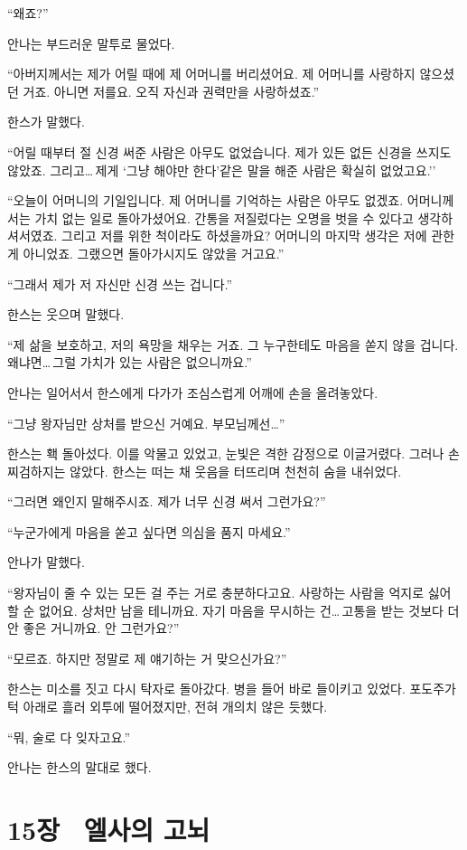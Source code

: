 ``왜죠?''

안나는 부드러운 말투로 물었다.

``아버지께서는 제가 어릴 때에 제 어머니를 버리셨어요. 제 어머니를 사랑하지 않으셨던 거죠. 아니면 저를요. 오직 자신과 권력만을 사랑하셨죠.''

한스가 말했다.

``어릴 때부터 절 신경 써준 사람은 아무도 없었습니다. 제가 있든 없든 신경을 쓰지도 않았죠. 그리고\ldots\,제게 `그냥 해야만 한다'같은 말을 해준 사람은 확실히 없었고요.''

``오늘이 어머니의 기일입니다. 제 어머니를 기억하는 사람은 아무도 없겠죠. 어머니께서는 가치 없는 일로 돌아가셨어요. 간통을 저질렀다는 오명을 벗을 수 있다고 생각하셔서였죠. 그리고 저를 위한 척이라도 하셨을까요? 어머니의 마지막 생각은 저에 관한 게 아니었죠. 그랬으면 돌아가시지도 않았을 거고요.''

``그래서 제가 저 자신만 신경 쓰는 겁니다.''

한스는 웃으며 말했다.

``제 삶을 보호하고, 저의 욕망을 채우는 거죠. 그 누구한테도 마음을 쏟지 않을 겁니다. 왜냐면\ldots\,그럴 가치가 있는 사람은 없으니까요.''

안나는 일어서서 한스에게 다가가 조심스럽게 어깨에 손을 올려놓았다.

``그냥 왕자님만 상처를 받으신 거예요. 부모님께선\ldots''

한스는 홱 돌아섰다. 이를 악물고 있었고, 눈빛은 격한 감정으로 이글거렸다. 그러나 손찌검하지는 않았다. 한스는 떠는 채 웃음을 터뜨리며 천천히 숨을 내쉬었다.

``그러면 왜인지 말해주시죠. 제가 너무 신경 써서 그런가요?''

``누군가에게 마음을 쏟고 싶다면 의심을 품지 마세요.''

안나가 말했다.

``왕자님이 줄 수 있는 모든 걸 주는 거로 충분하다고요. 사랑하는 사람을 억지로 싫어할 순 없어요. 상처만 남을 테니까요. 자기 마음을 무시하는 건\ldots\,고통을 받는 것보다 더 안 좋은 거니까요. 안 그런가요?''

`` 모르죠. 하지만 정말로 제 얘기하는 거 맞으신가요?''

한스는 미소를 짓고 다시 탁자로 돌아갔다. 병을 들어 바로 들이키고 있었다. 포도주가 턱 아래로 흘러 외투에 떨어졌지만, 전혀 개의치 않은 듯했다.

``뭐, 술로 다 잊자고요.''

안나는 한스의 말대로 했다.



\chapter[15장  엘사의 고뇌][15장\hspace*{.5em}엘사의 고뇌]{15장 \ 엘사의 고뇌}



